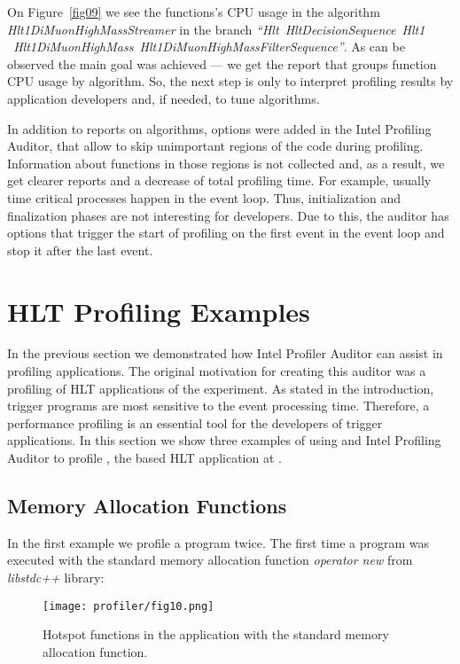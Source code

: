On Figure~\ref{fig09} we see the functions's CPU usage  in the algorithm {\it
Hlt1DiMuonHighMassStreamer\/} in the branch {\it ``Hlt~HltDecisionSequence~Hlt1
~Hlt1DiMuonHighMass~Hlt1DiMuonHighMassFilterSequence''}. As can be observed the
main goal was achieved --- we get the report that groups function CPU usage by
algorithm. So, the next step is only to interpret profiling results by
application developers and, if needed, to tune algorithms.

In addition to reports on algorithms, options were added in the \gaudi Intel Profiling 
Auditor, that allow to skip unimportant regions of the code during
profiling. Information about functions in those regions is not collected and,
as a result, we get clearer reports and a decrease of total profiling time. For
example, usually time critical processes happen in the event loop. Thus,
initialization and finalization phases are not interesting for developers. Due
to this, the auditor has options that trigger the start of  profiling on the
first event in the event loop and stop it after the last event.


\section{HLT Profiling Examples}

In the previous section we demonstrated how \gaudi Intel Profiler Auditor can
assist  in profiling \gaudi applications. The original motivation for creating
this auditor was a profiling of HLT applications of the \lhcb experiment. As 
stated in the introduction, trigger programs are most sensitive to the event
processing time. Therefore, a performance profiling is an essential tool for the 
developers of trigger applications. In this section we show three
examples of using \amp and \gaudi Intel Profiling Auditor to profile \moore, 
the \gaudi based HLT application at \lhcb.

\subsection{Memory Allocation Functions}

In the first example we profile a \moore program twice. The first time a program
was executed with the standard memory allocation function {\it operator new\/}
from {\it libstdc++\/} library:

\begin{figure}[H]
\texttt{[image: profiler/fig10.png]}
\caption{Hotspot functions in the \moore application with the
standard memory allocation function.}
\label{fig10}
\end{figure}

